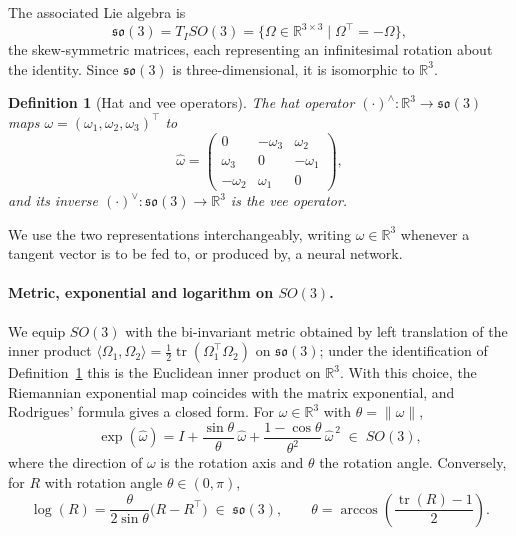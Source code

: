 \documentclass[a4paper,12pt]{article}
\newtheorem{definition}[theorem]{Definition}
\theoremstyle{remark}
\DeclareMathOperator{\tr}{tr}
\begin{document}
The associated Lie algebra is
\[
\mathfrak{so}(3)
=
T_ISO(3)
=
\bigl\{
\Omega\in\mathbb R^{3\times3}\;\big|\;\Omega^\top=-\Omega
\bigr\},
\]
the skew-symmetric matrices, each representing an infinitesimal rotation about the
identity. Since $\mathfrak{so}(3)$ is three-dimensional, it is isomorphic to $\mathbb R^3$.

\begin{definition}[Hat and vee operators]
\label{def:hatvee}
The hat operator $(\cdot)^\wedge:\mathbb R^3\rightarrow\mathfrak{so}(3)$ maps
$\omega=(\omega_1,\omega_2,\omega_3)^\top$ to
\[
\widehat{\omega}
=
\begin{pmatrix}
0 & -\omega_3 & \omega_2\\
\omega_3 & 0 & -\omega_1\\
-\omega_2 & \omega_1 & 0
\end{pmatrix},
\]
and its inverse $(\cdot)^\vee:\mathfrak{so}(3)\rightarrow\mathbb R^3$ is the vee
operator.
\end{definition}

We use the two representations interchangeably, writing $\omega\in\mathbb R^3$ whenever
a tangent vector is to be fed to, or produced by, a neural network.

\paragraph{Metric, exponential and logarithm on $SO(3)$.}
We equip $SO(3)$ with the bi-invariant metric obtained by left translation of the inner
product $\langle \Omega_1,\Omega_2\rangle=\tfrac12\tr(\Omega_1^\top\Omega_2)$ on
$\mathfrak{so}(3)$; under the identification of Definition~\ref{def:hatvee} this is the
Euclidean inner product on $\mathbb R^3$. With this choice, the Riemannian exponential
map coincides with the matrix exponential, and Rodrigues' formula gives a closed form.
For $\omega\in\mathbb R^3$ with $\theta=\|\omega\|$,
\begin{equation}
\label{eq:rodrigues}
\exp(\widehat\omega)
=
I
+
\frac{\sin\theta}{\theta}\,\widehat\omega
+
\frac{1-\cos\theta}{\theta^2}\,\widehat\omega^{\,2}
\;\in\;SO(3),
\end{equation}
where the direction of $\omega$ is the rotation axis and $\theta$ the rotation angle.
Conversely, for $R$ with rotation angle $\theta\in(0,\pi)$,
\begin{equation}
\label{eq:so3log}
\log(R)
=
\frac{\theta}{2\sin\theta}\bigl(R-R^\top\bigr)
\;\in\;\mathfrak{so}(3),
\qquad
\theta
=
\arccos\!\left(\frac{\tr(R)-1}{2}\right).
\end{equation}
\end{document}
